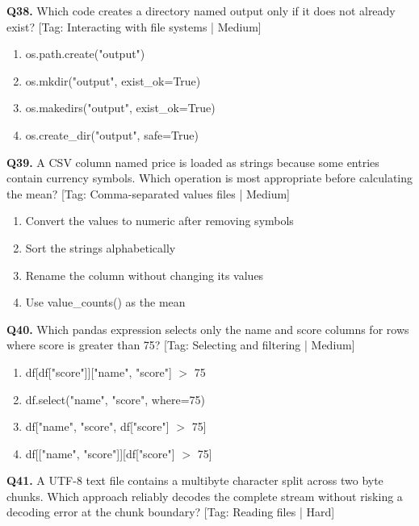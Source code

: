 \vspace{2mm}
\noindent\textbf{Q38.} Which code creates a directory named output only if it does not already exist? \hfill [Tag: Interacting with file systems | Medium]
\begin{enumerate}[label=(\alph*),topsep=2pt,itemsep=1pt,partopsep=0pt,parsep=0pt]
    \item {os.path.create("output")}
    \item {os.mkdir("output", exist\_ok=True)}
    \item {os.makedirs("output", exist\_ok=True)}
    \item {os.create\_dir("output", safe=True)}
\end{enumerate}
\vspace{2mm}
\noindent\textbf{Q39.} A CSV column named price is loaded as strings because some entries contain currency symbols. Which operation is most appropriate before calculating the mean? \hfill [Tag: Comma-separated values files | Medium]
\begin{enumerate}[label=(\alph*),topsep=2pt,itemsep=1pt,partopsep=0pt,parsep=0pt]
    \item {Convert the values to numeric after removing symbols}
    \item {Sort the strings alphabetically}
    \item {Rename the column without changing its values}
    \item {Use value\_counts() as the mean}
\end{enumerate}
\vspace{2mm}
\noindent\textbf{Q40.} Which pandas expression selects only the name and score columns for rows where score is greater than 75? \hfill [Tag: Selecting and filtering | Medium]
\begin{enumerate}[label=(\alph*),topsep=2pt,itemsep=1pt,partopsep=0pt,parsep=0pt]
    \item {df[df["score"]]["name", "score"] $>$ 75}
    \item {df.select("name", "score", where=75)}
    \item {df["name", "score", df["score"] $>$ 75]}
    \item {df[["name", "score"]][df["score"] $>$ 75]}
\end{enumerate}
\vspace{2mm}
\noindent\textbf{Q41.} A UTF-8 text file contains a multibyte character split across two byte chunks. Which approach reliably decodes the complete stream without risking a decoding error at the chunk boundary? \hfill [Tag: Reading files | Hard]
